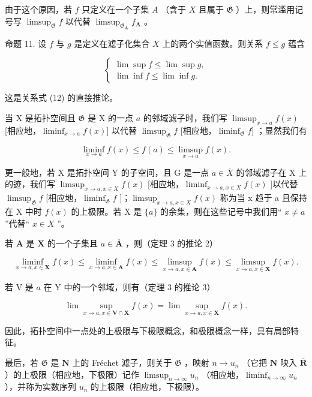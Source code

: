 由于这个原因，若 \(f\) 只定义在一个子集 \(A\) （含于 \(X\) 且属于 \(\mathfrak{G}\) ）上，则常滥用记号写 \(\limsup_{\mathfrak{G}} f\) 以代替 \(\limsup_{\mathfrak{G}_{\mathbf{A}}} f_{\mathbf{A}}\) 。

命题 11. 设 \(f\) 与 \(g\) 是定义在滤子化集合 \(X\) 上的两个实值函数。则关系 \(f \leqslant g\) 蕴含

\[
\left\{ \begin{array}{l} \lim \sup f \leqslant \lim \sup g, \\ \lim \inf f \leqslant \lim \inf g. \end{array} \right.\tag{14}
\]

这是关系式 (12) 的直接推论。

当 X 是拓扑空间且 \(\mathfrak{G}\) 是 X 的一点 \(a\) 的邻域滤子时，我们写 \(\limsup_{x\to a}f(x)\) {[}相应地，\(\liminf_{x\to a}f(x)]\) 以代替 \(\limsup_{\mathfrak{G}}f\) {[}相应地，\(\liminf_{\mathfrak{G}}f]\) ；显然我们有

\[
\liminf _ {x \to a} f (x) \leqslant f (a) \leqslant \limsup _ {x \to a} f (x).\tag{15}
\]

更一般地，若 X 是拓扑空间 Y 的子空间，且 G 是一点 \(a \in \overline{X}\) 的邻域滤子在 X 上的迹，我们写 \(\limsup_{x \to a, x \in X} f(x)\) {[}相应地，\(\liminf_{x \to a, x \in X} f(x)\) {]}以代替 \(\limsup_{\mathfrak{G}} f\) {[}相应地，\(\liminf_{\mathfrak{G}} f\) {]}；\(\limsup_{x \to a, x \in X} f(x)\) 称为当 x 趋于 a 且保持在 X 中时 \(f(x)\) 的上极限。若 X 是 \(\{a\}\) 的余集，则在这些记号中我们用`` \(x \neq a\) ''代替`` \(x \in X\) ''。

若 \(\mathbf{A}\) 是 \(\mathbf{X}\) 的一个子集且 \(a \in \overline{\mathbf{A}}\) ，则（定理 3 的推论 2）

\[
\liminf _ {x \to a, x \in \mathbf {X}} f (x) \leqslant \liminf _ {x \to a, x \in \mathbf {A}} f (x) \leqslant \limsup _ {x \to a, x \in \mathbf {A}} f (x) \leqslant \limsup _ {x \to a, x \in \mathbf {X}} f (x).
\]

若 V 是 \(a\) 在 Y 中的一个邻域，则有（定理 3 的推论 3）

\[
\lim \sup _ {x \to a, x \in \mathbf {V} \cap \mathbf {X}} f (x) = \lim \sup _ {x \to a, x \in \mathbf {X}} f (x).
\]

因此，拓扑空间中一点处的上极限与下极限概念，和极限概念一样，具有局部特征。

最后，若 \(\mathfrak{G}\) 是 \(\mathbf{N}\) 上的 Fréchet 滤子，则关于 \(\mathfrak{G}\) ，映射 \(n \to u_n\) （它把 \(\mathbf{N}\) 映入 \(\overline{\mathbf{R}}\) ）的上极限（相应地，下极限）记作 \(\limsup_{n \to \infty} u_n\) （相应地，\(\liminf_{n \to \infty} u_n\) ），并称为实数序列 \(u_n\) 的上极限（相应地，下极限）。

